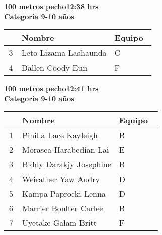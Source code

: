 \begin{minipage}{0.95\linewidth}\vspace{0.5cm} 
\begin{flushleft}
\textbf{
\hspace{-0.15cm}100 metros pecho\hspace{1.5cm}12:38 hrs \\Categoria 9-10 años}\vspace{-0.2cm} 
\end{flushleft}
\begin{tabular}{cp{0.63\linewidth}l}
\hline
& \textbf{Nombre} & \textbf{Equipo} \\ \hline
3 & Leto Lizama Lashaunda & C \\ 
4 & Dallen Coody Eun & F \\ 
\end{tabular}
\end{minipage}
\begin{minipage}{0.95\linewidth}\vspace{0.5cm} 
\begin{flushleft}
\textbf{
\hspace{-0.15cm}100 metros pecho\hspace{1.5cm}12:41 hrs \\Categoria 9-10 años}\vspace{-0.2cm} 
\end{flushleft}
\begin{tabular}{cp{0.63\linewidth}l}
\hline
& \textbf{Nombre} & \textbf{Equipo} \\ \hline
1 & Pinilla Lace Kayleigh & B \\ 
2 & Morasca Harabedian Lai & E \\ 
3 & Biddy Darakjy Josephine & B \\ 
4 & Weirather Yaw Audry & D \\ 
5 & Kampa Paprocki Lenna & D \\ 
6 & Marrier Boulter Carlee & B \\ 
7 & Uyetake Galam Britt & F \\ 
\end{tabular}
\end{minipage}

